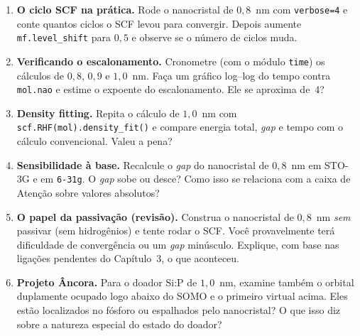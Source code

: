\documentclass[11pt,a4paper,openany]{book}
\newcommand{\code}[1]{\texttt{#1}}
\begin{document}
\begin{enumerate}[leftmargin=*,label=\textbf{4.\arabic*}]
  \item \textbf{O ciclo SCF na prática.} Rode o nanocristal de $0{,}8$~nm com
        \code{verbose=4} e conte quantos ciclos o SCF levou para convergir. Depois
        aumente \code{mf.level\_shift} para $0{,}5$ e observe se o número de ciclos
        muda.

  \item \textbf{Verificando o escalonamento.} Cronometre (com o módulo \code{time})
        os cálculos de $0{,}8$, $0{,}9$ e $1{,}0$~nm. Faça um gráfico
        log--log do tempo contra \code{mol.nao} e estime o expoente do
        escalonamento. Ele se aproxima de~4?

  \item \textbf{Density fitting.} Repita o cálculo de $1{,}0$~nm com
        \code{scf.RHF(mol).density\_fit()} e compare energia total, \emph{gap} e
        tempo com o cálculo convencional. Valeu a pena?

  \item \textbf{Sensibilidade à base.} Recalcule o \emph{gap} do nanocristal de
        $0{,}8$~nm em STO-3G e em \code{6-31g}. O \emph{gap} sobe ou desce? Como
        isso se relaciona com a caixa de Atenção sobre valores absolutos?

  \item \textbf{O papel da passivação (revisão).} Construa o nanocristal de
        $0{,}8$~nm \emph{sem} passivar (sem hidrogênios) e tente rodar o SCF. Você
        provavelmente terá dificuldade de convergência ou um \emph{gap}
        minúsculo. Explique, com base nas ligações pendentes do Capítulo~3, o que
        aconteceu.

  \item \textbf{Projeto Âncora.} Para o doador Si:P de $1{,}0$~nm, examine também o
        orbital duplamente ocupado logo abaixo do SOMO e o primeiro virtual acima.
        Eles estão localizados no fósforo ou espalhados pelo nanocristal? O que
        isso diz sobre a natureza especial do estado do doador?
\end{enumerate}
\end{document}

